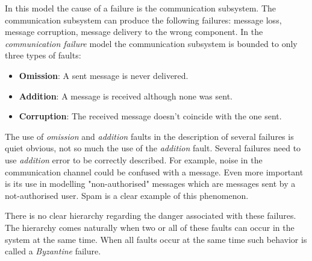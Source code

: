 \documentclass[..]{subfiles}
\begin{document}
In this model the cause of a failure is the communication subsystem. The communication subsystem can produce the following failures: message loss, message corruption, message delivery to the wrong component. In the \textit{communication failure} model the communication subsystem is bounded to only three types of faults:
\begin{itemize}
	\item \textbf{Omission}: A sent message is never delivered.
	\item \textbf{Addition}: A message is received although none was sent.
	\item \textbf{Corruption}: The received message doesn't coincide with the one sent.
\end{itemize}
The use of \textit{omission} and \textit{addition} faults in the description of several failures is quiet obvious, not so much the use of the \textit{addition} fault. Several failures need to use \textit{addition} error to be correctly described. For example, noise in the communication channel could be confused with a message. Even more important is its use in modelling "non-authorised" messages which are messages sent by a not-authorised user. Spam is a clear example of this phenomenon.

There is no clear hierarchy regarding the danger associated with these failures. The hierarchy comes naturally when two or all of these faults can occur in the system at the same time. When all faults occur at the same time such behavior is called a \textit{Byzantine} failure.
\end{document}

